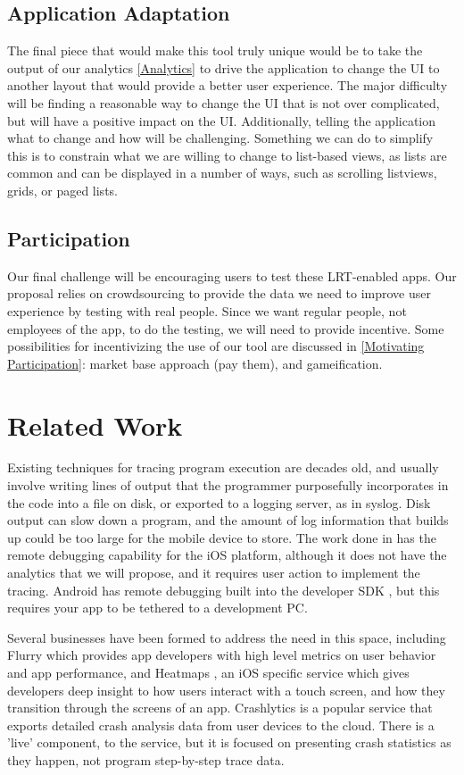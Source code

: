 \documentclass{acm_proc_article-sp}
\begin{document}
\subsection{Application Adaptation}
The final piece that would make this tool truly unique would be to take the output
of our analytics \ref{Analytics} to drive the application to change the UI to
another layout that would provide a better user experience. The major difficulty will
be finding a reasonable way to change the UI that is not over complicated, but will
have a positive impact on the UI. Additionally, telling the application what to change
and how will be challenging. Something we can do to simplify this is to constrain what
we are willing to change to list-based views, as lists are common and can be displayed
in a number of ways, such as scrolling listviews, grids, or paged lists.

\subsection{Participation}
Our final challenge will be encouraging users to test these LRT-enabled apps. Our
proposal relies on crowdsourcing to provide the data we need to improve user
experience by testing with real people. Since we want regular people, not employees
of the app, to do the testing, we will need to provide incentive. Some possibilities
for incentivizing the use of our tool are discussed in \ref{Motivating Participation}:
market base approach (pay them), and gameification.

\section{Related Work}
Existing techniques for tracing program execution are decades old, and usually 
involve writing lines of output that the programmer purposefully incorporates 
in the code into a file on disk, or exported to a logging server, as in syslog. 
Disk output can slow down a program, and the amount of log information that 
builds up could be too large for the mobile device to store. The work done in 
\cite{NSLogger} has the remote debugging capability for the iOS platform, although 
it does not have the analytics that we will propose, and it requires user action 
to implement the tracing. Android has remote debugging built into the developer 
SDK \cite{AndroidRemoteDebugTool}, but this requires your app to be tethered to a development PC.

Several businesses have been formed to address the need in this space, including
Flurry \cite{Flurry} which provides app developers with high level metrics on
user behavior and app performance, and Heatmaps \cite{Heatmaps}, an iOS specific
service which gives developers deep insight to how users interact with a touch
screen, and how they transition through the screens of an app. 
Crashlytics \cite{Crashlytics} is a popular service that exports detailed
crash analysis data from user devices to the cloud. There is a 'live' component,
to the service, but it is focused on presenting crash statistics as they happen,
not program step-by-step trace data.
\end{document}
